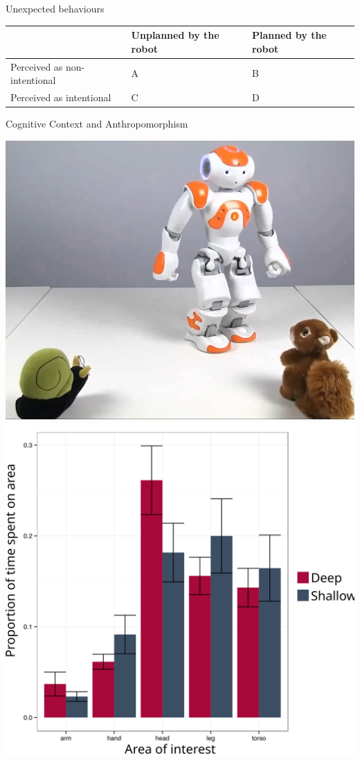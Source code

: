 \documentclass[xcolor=table]{beamer}
\begin{document}

\begin{frame}{Unexpected behaviours}

    \centering
    \begin{tabular}{  >{\centering\arraybackslash}m{2cm} | >{\centering\arraybackslash}m{2cm} | >{\centering\arraybackslash}m{2cm} }
        & Unplanned by the robot & Planned by the robot \\ \hline
        Perceived as non-intentional & A  & B  \\ \hline
        Perceived as intentional &  C & D 
    \end{tabular}


\end{frame}


\begin{frame}{Cognitive Context and Anthropomorphism}
    \begin{center}
        \includegraphics[width=0.45\linewidth]{stimulus-toys}
        \hspace*{1cm}
        \includegraphics[width=0.45\linewidth]{cognitive-priming}
    \end{center}
\end{frame}
\end{document}
